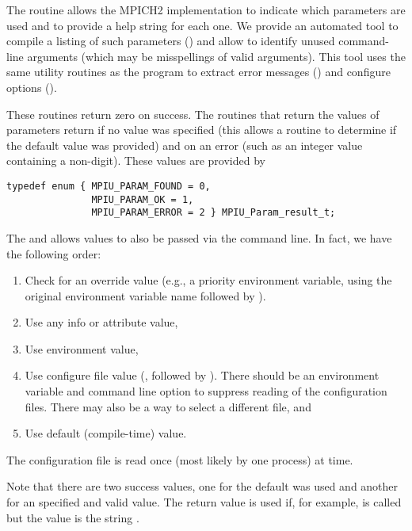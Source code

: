 \documentclass{article}
\begin{document}
The routine  allows the MPICH2 implementation to
indicate which parameters are used and to provide a help string for each one.
We provide an automated tool to compile a listing of such parameters
() and
allow  to identify unused command-line arguments
(which may be misspellings of valid arguments).  This tool uses the same
utility routines as the program to extract error messages
() and configure options ().

These routines return zero on success.  The routines that return the values of
parameters return  if no value was specified (this
allows a routine to 
determine if the default value was provided) and
 on an error (such as an
integer value containing a non-digit).  These values are provided by
\begin{verbatim}
typedef enum { MPIU_PARAM_FOUND = 0, 
               MPIU_PARAM_OK = 1, 
               MPIU_PARAM_ERROR = 2 } MPIU_Param_result_t;
\end{verbatim}

The  and  allows
values to also be passed via the command line.  
In fact, we have the following order:
\begin{enumerate}
\item Check for an override value (e.g., a priority environment
  variable, using the original environment variable name followed by 
  ).
\item Use any info or attribute value,
\item Use environment value,
\item Use configure file value (, followed by
  ).  There should be an environment variable and command
  line option to suppress reading of the configuration files.  There
  may also be a way to select a different file, and
\item Use default (compile-time) value.
\end{enumerate}
The configuration file is read once (most likely by one process) at
 time.  

Note that there are two success values, one for the default was used
and another for an specified and valid value.  The return value
 is used 
if, for example,  is called but the value
is the string .
\end{document}
